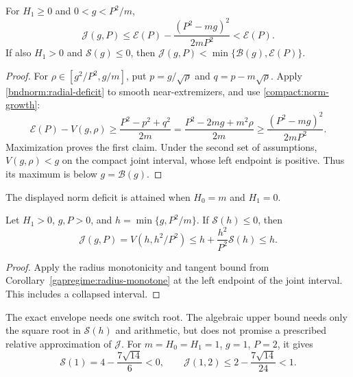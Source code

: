 \begin{corollary}\label{joint:strict}
For $H_1\ge0$ and $0<g<P^2/m$,
\[
 \mathcal J(g,P)\le\mathcal E(P)
   -\frac{(P^2-mg)^2}{2mP^2}<\mathcal E(P).
\]
If also $H_1>0$ and $\mathcal S(g)\le0$, then
$\mathcal J(g,P)<\min\{\mathcal B(g),\mathcal E(P)\}$.
\end{corollary}
\begin{proof}
For $\rho\in[g^2/P^2,g/m]$, put $p=g/\sqrt\rho$ and
$q=p-m\sqrt\rho$. Apply \eqref{bndnorm:radial-deficit} to smooth
near-extremizers, and use \eqref{compact:norm-growth}:
\[
 \mathcal E(P)-V(g,\rho)
 \ge\frac{P^2-p^2+q^2}{2m}
 =\frac{P^2-2mg+m^2\rho}{2m}
 \ge\frac{(P^2-mg)^2}{2mP^2}.
\]
Maximization proves the first claim. Under the second set of assumptions,
$V(g,\rho)<g$ on the compact joint interval, whose left endpoint is
positive. Thus its maximum is below $g=\mathcal B(g)$.
\end{proof}
The displayed norm deficit is attained when $H_0=m$ and $H_1=0$.

\begin{corollary}
\label{joint:ordinary}\label{joint:regime}
Let $H_1>0$, $g,P>0$, and $h=\min\{g,P^2/m\}$.
If $\mathcal S(h)\le0$, then
\begin{equation}\label{joint:ordinary-formula}
 \mathcal J(g,P)=V(h,h^2/P^2)
 \le h+\frac{h^2}{P^2}\mathcal S(h)\le h.
\end{equation}
\end{corollary}
\begin{proof}
Apply the radius monotonicity and tangent bound from
Corollary~\ref{gapregime:radius-monotone} at the left endpoint of the
joint interval. This includes a collapsed interval.
\end{proof}
The exact envelope needs one switch root. The algebraic upper bound
needs only the square root in $\mathcal S(h)$ and arithmetic, but
does not promise a prescribed relative approximation of $\mathcal J$.
For $m=H_0=H_1=1$, $g=1$, $P=2$, it gives
\[
 \mathcal S(1)=4-\frac{7\sqrt{14}}6<0,\qquad
 \mathcal J(1,2)\le2-\frac{7\sqrt{14}}{24}<1.
\]

